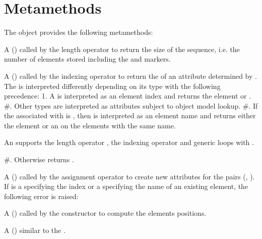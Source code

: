 \documentclass[letterpaper,10pt,english]{sphinxmanual}
\begin{document}
\section{Metamethods}
\label{\detokenize{sequences:metamethods}}
\sphinxAtStartPar
The  object provides the following metamethods:
\begin{description}
\sphinxAtStartPar
A  () called by the length operator \sphinxcode{\sphinxupquote{\#}} to return the size of the sequence, i.e. the number of elements stored including the  and
 markers.

\sphinxAtStartPar
A  () called by the indexing operator \sphinxcode{\sphinxupquote{{[}key{]}}} to return the  of an attribute determined by . The  is interpreted differently depending
on its type with the following precedence:
1. A  is interpreted as an element index and returns the element or .
\#. Other  types are interpreted as  attributes subject to object model lookup.
\#. If the  associated with  is , then  is interpreted as an element name and returns either the element or an  on the elements with the same name. %
\begin{footnote}[4]\sphinxAtStartFootnote
An  supports the length operator \sphinxcode{\sphinxupquote{\#}}, the indexing operator \sphinxcode{\sphinxupquote{{[}{]}}} and generic  loops with .
%
\end{footnote}
\#. Otherwise returns .

\sphinxAtStartPar
A  () called by the assignment operator  to create new attributes for the pairs (, ).
If  is a  specifying the index or a  specifying the name of an existing element, the following error is raised:

\sphinxAtStartPar
A  () called by the constructor to compute the elements positions.

\sphinxAtStartPar
A  () similar to the  .

\end{description}
\end{document}
